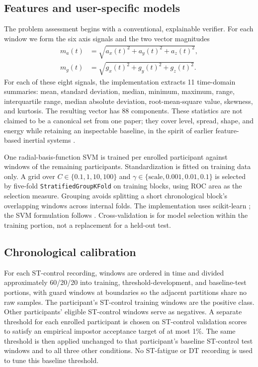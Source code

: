 \documentclass[conference]{IEEEtran}
\begin{document}
\subsection{Features and user-specific models}
The problem assessment begins with a conventional, explainable verifier. For each window we form the six axis signals and the two vector magnitudes
\begin{align}
m_a(t)&=\sqrt{a_x(t)^2+a_y(t)^2+a_z(t)^2},\\
m_g(t)&=\sqrt{g_x(t)^2+g_y(t)^2+g_z(t)^2}.
\end{align}
For each of these eight signals, the implementation extracts 11 time-domain summaries: mean, standard deviation, median, minimum, maximum, range, interquartile range, median absolute deviation, root-mean-square value, skewness, and kurtosis. The resulting vector has 88 components. These statistics are not claimed to be a canonical set from one paper; they cover level, spread, shape, and energy while retaining an inspectable baseline, in the spirit of earlier feature-based inertial systems \cite{SpragerHOS2015,Nair2023}.

One radial-basis-function SVM is trained per enrolled participant against windows of the remaining participants. Standardization is fitted on training data only. A grid over $C\in\{0.1,1,10,100\}$ and $\gamma\in\{\mathrm{scale},0.001,0.01,0.1\}$ is selected by five-fold \texttt{StratifiedGroupKFold} on training blocks, using ROC area as the selection measure. Grouping avoids splitting a short chronological block's overlapping windows across internal folds. The implementation uses scikit-learn \cite{Pedregosa2011}; the SVM formulation follows \cite{Cortes1995}. Cross-validation is for model selection within the training portion, not a replacement for a held-out test.

\subsection{Chronological calibration}
For each ST-control recording, windows are ordered in time and divided approximately 60/20/20 into training, threshold-development, and baseline-test portions, with guard windows at boundaries so the adjacent partitions share no raw samples. The participant's ST-control training windows are the positive class. Other participants' eligible ST-control windows serve as negatives. A separate threshold for each enrolled participant is chosen on ST-control validation scores to satisfy an empirical impostor acceptance target of at most 1\%. The same threshold is then applied unchanged to that participant's baseline ST-control test windows and to all three other conditions. No ST-fatigue or DT recording is used to tune this baseline threshold.
\end{document}
